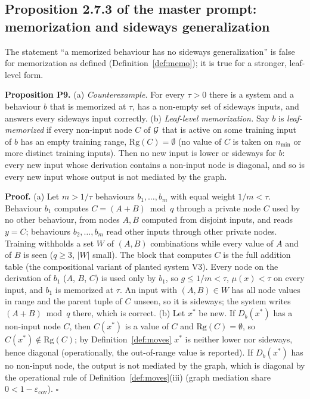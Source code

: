 \subsection{Proposition 2.7.3 of the master prompt: memorization and sideways generalization}
\label{proof:P9}
The statement ``a memorized behaviour has no sideways generalization'' is
false for memorization as defined (Definition~\ref{def:memo}); it is true for a
stronger, leaf-level form.

\textbf{Proposition P9.} (a) \emph{Counterexample.} For every $\tau>0$ there
is a system and a behaviour $b$ that is memorized at $\tau$, has a non-empty
set of sideways inputs, and answers every sideways input correctly.
(b) \emph{Leaf-level memorization.} Say $b$ is \emph{leaf-memorized} if every
non-input node $C$ of $\mathcal{G}$ that is active on some training input of $b$ has an
empty training range, $\mathrm{Rg}(C)=\emptyset$ (no value of $C$ is taken on
$n_{\min}$ or more distinct training inputs). Then no new input is lower or
sideways for $b$: every new input whose derivation contains a non-input node
is diagonal, and so is every new input whose output is not mediated by the
graph.

\textbf{Proof.} (a) Let $m>1/\tau$ behaviours $b_1,\dots,b_m$ with equal weight
$1/m<\tau$. Behaviour $b_1$ computes $C=(A+B)\bmod q$ through a private node $C$
used by no other behaviour, from nodes $A,B$ computed from disjoint inputs,
and reads $y=C$; behaviours $b_2,\dots,b_m$ read other inputs through other
private nodes. Training withholds a set $W$ of $(A,B)$ combinations while
every value of $A$ and of $B$ is seen ($q\ge3$, $|W|$ small). The block that
computes $C$ is the full addition table (the compositional variant of planted
system V3). Every node on the derivation of $b_1$ ($A$, $B$, $C$) is used only
by $b_1$, so $g\le 1/m<\tau$, $\mu(x)<\tau$ on every input, and $b_1$ is
memorized at $\tau$. An input with $(A,B)\in W$ has all node values in range
and the parent tuple of $C$ unseen, so it is sideways; the system writes
$(A+B)\bmod q$ there, which is correct.
(b) Let $x^\ast$ be new. If $D_b(x^\ast)$ has a non-input node $C$, then
$C(x^\ast)$ is a value of $C$ and $\mathrm{Rg}(C)=\emptyset$, so
$C(x^\ast)\notin\mathrm{Rg}(C)$; by Definition~\ref{def:moves} $x^\ast$ is
neither lower nor sideways, hence diagonal (operationally, the out-of-range
value is reported). If $D_b(x^\ast)$ has no non-input node, the output is not
mediated by the graph, which is diagonal by the operational rule of
Definition~\ref{def:moves}(iii) (graph mediation share $0<1-\varepsilon_{\mathrm{cov}}$).
\hfill$\square$


